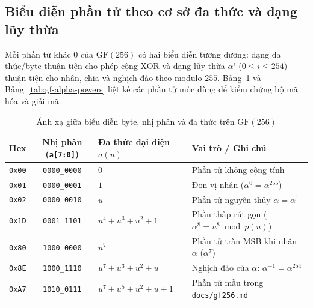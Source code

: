 \documentclass[11pt,a4paper]{report}
\begin{document}
\subsection{Biểu diễn phần tử theo cơ sở đa thức và dạng lũy thừa}

Mỗi phần tử khác $0$ của $\text{GF}(256)$ có hai biểu diễn tương đương: dạng đa thức/byte thuận tiện cho phép cộng XOR và dạng lũy thừa $\alpha^i$ ($0 \le i \le 254$) thuận tiện cho nhân, chia và nghịch đảo theo modulo $255$. Bảng~\ref{tab:gf-poly-map} và Bảng~\ref{tab:gf-alpha-powers} liệt kê các phần tử mốc dùng để kiểm chứng bộ mã hóa và giải mã.

\begin{table}[!htb]
    \centering
    \caption{Ánh xạ giữa biểu diễn byte, nhị phân và đa thức trên $\text{GF}(256)$}
    \label{tab:gf-poly-map}
    \footnotesize
    \begin{tabularx}{\textwidth}{@{} c c l X @{}}
        \toprule
        \textbf{Hex} & \textbf{Nhị phân (\texttt{a[7:0]})} & \textbf{Đa thức đại diện $a(u)$} & \textbf{Vai trò / Ghi chú} \\
        \midrule
        \texttt{0x00} & \texttt{0000\_0000} & $0$ & Phần tử không cộng tính \\
        \texttt{0x01} & \texttt{0000\_0001} & $1$ & Đơn vị nhân ($\alpha^0 = \alpha^{255}$) \\
        \texttt{0x02} & \texttt{0000\_0010} & $u$ & Phần tử nguyên thủy $\alpha = \alpha^1$ \\
        \texttt{0x1D} & \texttt{0001\_1101} & $u^4 + u^3 + u^2 + 1$ & Phần thấp rút gọn ($\alpha^8 = u^8 \bmod p(u)$) \\
        \texttt{0x80} & \texttt{1000\_0000} & $u^7$ & Phần tử tràn MSB khi nhân $\alpha$ ($\alpha^7$) \\
        \texttt{0x8E} & \texttt{1000\_1110} & $u^7 + u^3 + u^2 + u$ & Nghịch đảo của $\alpha$: $\alpha^{-1} = \alpha^{254}$ \\
        \texttt{0xA7} & \texttt{1010\_0111} & $u^7 + u^5 + u^2 + u + 1$ & Phần tử mẫu trong \texttt{docs/gf256.md} \\
        \bottomrule
    \end{tabularx}
\end{table}
\end{document}
